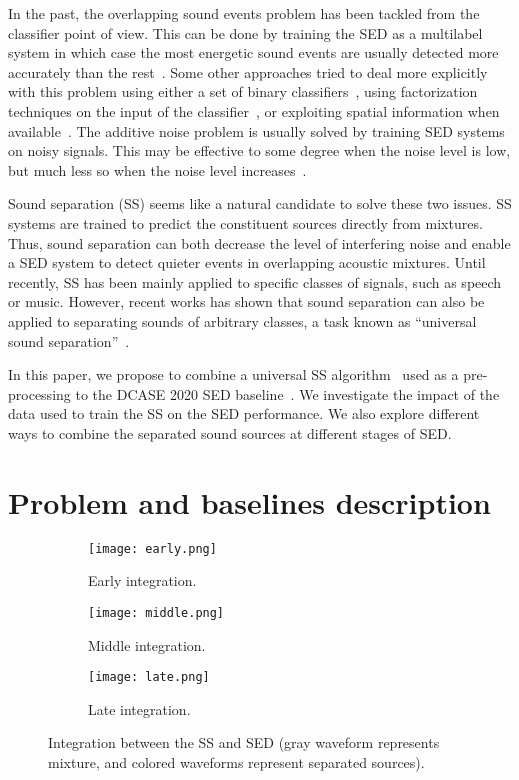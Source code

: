 \documentclass{article}
\begin{document}
\begin{sloppy}
In the past, the overlapping sound events problem has been tackled from the classifier point of view. This can be done by training the SED as a multilabel system in which case the most energetic sound events are usually detected more accurately than the rest~\cite{salamon2015feature,serizel_2020}. Some other approaches tried to deal more explicitly with this problem using either a set of binary classifiers~\cite{mesaros2016tut}, using factorization techniques on the input of the classifier~\cite{benetos2016detection,bisot2017overlapping}, or exploiting spatial information when available~\cite{adavanne2018multichannel}. The additive noise problem is usually solved by training SED systems on noisy signals. This may be effective to some degree when the noise level is low, but much less so when the noise level increases~\cite{serizel_2020}.

Sound separation (SS) seems like a natural candidate to solve these two issues.
SS systems are trained to predict the constituent sources directly from mixtures. Thus, sound separation can both decrease the level of interfering noise and enable a SED system to detect quieter events in overlapping acoustic mixtures.
Until recently, SS has been mainly applied to specific classes of signals, such as speech or music. However, recent works has shown that sound separation can also be applied to separating sounds of arbitrary classes, a task known as ``universal sound separation''~\cite{kavalerov2019universal,tzinis2020improving,olvera:hal-02567542}.

In this paper, we propose to combine a universal SS algorithm~\cite{kavalerov2019universal,tzinis2020improving} used as a pre-processing to the DCASE 2020 SED baseline~\cite{turpault2020}. We investigate the impact of the data used to train the SS on the SED performance. We also explore different ways to combine the separated sound sources at different stages of SED.

\section{Problem and baselines description}
\label{sec:pb}

\begin{figure*}
    \centering
\begin{subfigure}[b]{0.16\textwidth}
  \centering
  \texttt{[image: early.png]}
  \caption{Early integration.}
\label{fig:sed_early}
\end{subfigure}\hfill
    \begin{subfigure}[b]{0.35\textwidth}
\centering
  \texttt{[image: middle.png]}
  \caption{Middle integration.}
\label{fig:sed_middle}
\end{subfigure}\hfill
    \begin{subfigure}[b]{0.41\textwidth}
\centering
  \texttt{[image: late.png]}
  \caption{Late integration.}
\label{fig:sed_late}
\end{subfigure}\hfill
\caption{Integration between the SS and SED (gray waveform represents mixture, and colored waveforms represent separated sources).}
\end{figure*}


\end{sloppy}
\end{document}
